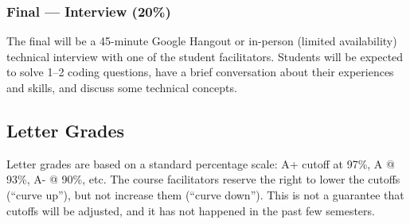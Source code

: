 \documentclass[12pt]{article}
\begin{document}
\subsubsection*{Final --- Interview (20\%)}
The final will be a 45-minute Google Hangout or in-person (limited availability) technical interview with one of the student facilitators.
Students will be expected to solve 1--2 coding questions, have a brief conversation about their experiences and skills, and discuss some technical concepts.

\subsection*{Letter Grades}
Letter grades are based on a standard percentage scale: A+ cutoff at 97\%, A @ 93\%, A- @ 90\%, etc.
The course facilitators reserve the right to lower the cutoffs (``curve up''), but not increase them (``curve down''). This is not a guarantee that cutoffs will be adjusted, and it has not happened in the past few semesters.

\end{document}
